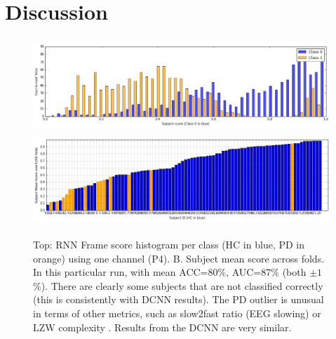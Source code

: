 \documentclass[review]{elsarticle}
\begin{document}

%
\section{Discussion}

\begin{figure}
	\centering
	\includegraphics[height=3.5cm]{figures/histogramsIt7}
		\includegraphics[height=3.4cm]{figures/subjectmeanscoresIt7}
	\caption{Top: RNN Frame score histogram per class (HC in blue, PD in orange) using one channel (P4). B. Subject mean score across folds. In this particular run, with mean  ACC=80\%, AUC=87\% (both $\pm 1$\%). There are clearly some subjects that are not classified correctly (this is consistently with DCNN results). The PD outlier is unusual in terms of other metrics, such as slow2fast ratio (EEG slowing) or LZW complexity \cite{Ruffini:2017ac}. Results from the DCNN are very similar.}
	\label{fig:scores}
\end{figure}
\end{document}
